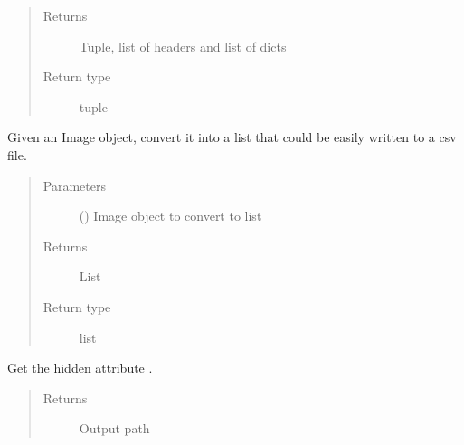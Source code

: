 \documentclass[letterpaper,10pt,english]{sphinxmanual}
\begin{document}
\begin{fulllineitems}
\begin{fulllineitems}
\begin{quote}
\begin{description}
\item[{Returns}] \leavevmode
Tuple, list of headers and list of dicts

\item[{Return type}] \leavevmode
tuple

\end{description}\end{quote}

\end{fulllineitems}


\begin{fulllineitems}
\label{\detokenize{polo.utils:polo.utils.io_utils.RunCsvWriter.image_to_row}}
Given an Image object, convert it into a list that could be
easily written to a csv file.
\begin{quote}\begin{description}
\item[{Parameters}] \leavevmode
{} ({\hyperref[\detokenize{polo.crystallography:polo.crystallography.image.Image}]{}}) \textendash{} Image object to convert to list

\item[{Returns}] \leavevmode
List

\item[{Return type}] \leavevmode
list

\end{description}\end{quote}

\end{fulllineitems}


\begin{fulllineitems}
\label{\detokenize{polo.utils:polo.utils.io_utils.RunCsvWriter.output_path}}
Get the hidden attribute .
\begin{quote}\begin{description}
\item[{Returns}] \leavevmode
Output path


\end{description}
\end{quote}
\end{fulllineitems}
\end{fulllineitems}
\end{document}
